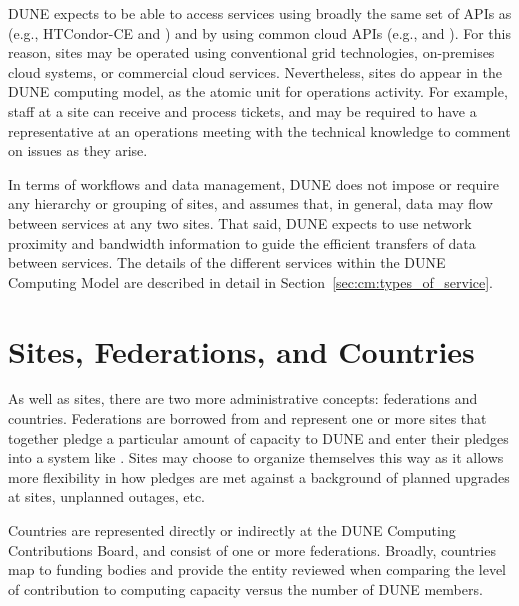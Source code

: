 \documentclass[../main-v1.tex]{subfiles}
\begin{document}
DUNE expects to be able to access services using broadly the same set of APIs as  (e.g., HTCondor-CE and ) and by using common cloud APIs (e.g.,  and ). 
For this reason, sites may be operated using conventional grid technologies, on-premises cloud systems, or commercial cloud services. Nevertheless, sites do appear in the DUNE computing model, as the atomic unit for operations activity. %
For example, staff at a site can receive and process tickets, %
and may be required to have a representative at an operations meeting with the technical knowledge to comment on issues as they arise.

In terms of workflows and data management, DUNE does not impose or require any hierarchy or grouping of sites, and assumes that, in general, data may flow between services at any two sites. That said, DUNE expects to use network proximity and bandwidth information to guide the efficient transfers of data between services. The details of the different services within the DUNE Computing Model are described in detail in Section~\ref{sec:cm:types_of_service}.

\section{Sites, Federations, and Countries}
\label{sec:cm:federations}

As well as sites, there are two more administrative concepts: federations and countries.
Federations are borrowed from  and represent one or more sites that together pledge a particular amount of capacity to DUNE and enter their pledges into a system like . %
Sites may choose to organize themselves this way as it allows more flexibility in how pledges are met against a background of planned upgrades at sites, unplanned outages, etc. 

Countries are represented directly or indirectly at the DUNE Computing Contributions Board, and consist of one or more federations. Broadly, countries map to funding bodies and %
provide the entity reviewed when comparing the level of contribution to computing capacity versus the number of DUNE members. %
\end{document}
